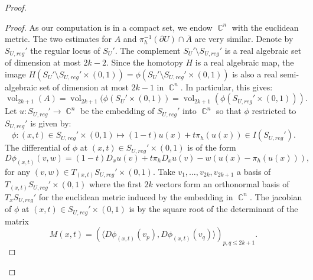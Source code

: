 \documentclass[12pt]{amsbook}%
\theoremstyle{definition}
\theoremstyle{remark}
\numberwithin{section}{chapter}
\numberwithin{subsection}{section}
\numberwithin{figure}{chapter}
\DeclareMathOperator{\C}{\mathbb{C}}
\DeclareMathOperator{\vol}{vol}
\begin{document}
{{\begin{proof}
\begin{proof}
As our computation is in a compact set, we endow $\C^n$ with the euclidean metric. The two estimates for $A$ and $\pi_h^{-1}(\partial U) \cap \overline{A}$ are very similar. 
Denote by ${S_{U,reg}'}$ the regular locus of ${S_U'}$. The complement ${S_U' \setminus S_{U,reg}'}$ is a real algebraic set of dimension at most $2k-2$. Since the homotopy  $H$ is a { real} algebraic map, the image $H({S_U' \setminus S_{U,reg}'} \times (0,1)) = \phi(S_U' \setminus S_{U,reg}' \times (0,1))$ is also a real semi-algebraic set of dimension at most $2k-1$ in $\C^n$. 
In particular, this gives: 
\begin{equation*}
\vol_{2k+1}(A)= \vol_{2k+1} (\phi(S_U' \times (0,1)) = \vol_{2k+1} ( \phi (S_{U,reg}' \times (0,1))). 
\end{equation*}
Let $u \colon S_{U,reg}' \to \C^n$ be the embedding of $S_{U,reg}'$ into $\C^n$ so that $\phi$ restricted to $S_{U,reg}'$ is given by: 
\begin{equation*}
\phi \colon (x,t) \in S_{U,reg}' \times (0,1) \mapsto (1-t) u(x) + t \pi_h (u(x)) \in I(S_{U,reg}').  
\end{equation*}
The differential of $\phi $ at $(x,t) \in S_{U,reg}'\times (0,1)$ is of the form
\begin{equation*}
D \phi_{(x,t)}(v, w) = (1-t) D_x u(v) + t \pi_h D_x u(v) - w ( u(x) - \pi_h (u(x))), 
\end{equation*}
for any $(v,w) \in T_{(x,t)} S_{U,reg}' \times (0,1)$.  
 Take $v_1, \ldots, v_{2k}, v_{2k+1}$ a basis of $T_{(x,t)} S_{U,reg}' \times (0,1)$ where the first $2k$ vectors form an orthonormal basis of $T_x S_{U,reg}'$ for the euclidean metric induced by the embedding in $\C^n$. 
The jacobian of $\phi$ at $(x,t) \in S_{U,reg}' \times (0,1)$  is by \cite[Assertion (2) of Lemma 5.1.4]{krantz_parks} the square root of the determinant of the matrix
\begin{equation}
M(x,t)= (\langle D\phi_{(x,t)}(v_p) , D\phi_{(x,t)}(v_q) \rangle)_{p,q \leqslant 2k+1}.
\end{equation}

\end{proof}
\end{proof}}}
\end{document}
